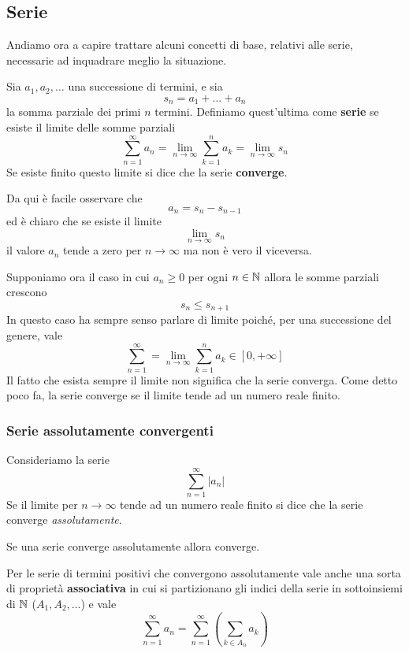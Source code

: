 \subsection{Serie}
Andiamo ora a capire trattare alcuni concetti di base, relativi alle serie, necessarie ad
inquadrare meglio la situazione.

\begin{definition}
	Sia $a_1, a_2, \dots$ una successione di termini, e sia
	\[ s_n = a_1 + \dots + a_n \]
	la somma parziale dei primi $n$ termini. Definiamo quest'ultima come \textbf{serie} se esiste
	il limite delle somme parziali
	\[ \sum_{n=1}^\infty a_n = \lim_{n \to \infty} \sum_{k=1}^n a_k = \lim_{n \to \infty} s_n \]
	Se esiste finito questo limite si dice che la serie \textbf{converge}.
\end{definition}

\begin{observation}
	Da qui è facile osservare che
	\[ a_n = s_n - s_{n-1} \]
	ed è chiaro che se esiste il limite
	\[ \lim_{n \to \infty} s_n \]
	il valore $a_n$ tende a zero per $n \to \infty$ ma non è vero il viceversa.
\end{observation}

Supponiamo ora il caso in cui $a_n \geq 0$ per ogni $n \in \mathbb{N}$ allora le somme parziali crescono
\[ s_n \leq s_{n+1} \]
In questo caso ha sempre senso parlare di limite poiché, per una successione del genere, vale
\[ \sum_{n=1}^\infty = \lim_{n \to \infty} \sum_{k=1}^n a_k \in [0, +\infty]  \]
Il fatto che esista sempre il limite non significa che la serie converga. Come detto poco fa, la
serie converge se il limite tende ad un numero reale finito.

\subsubsection{Serie assolutamente convergenti}
\begin{definition}
	Consideriamo la serie
	\[ \sum_{n=1}^\infty |a_n| \]
	Se il limite per $n \to \infty$ tende ad un numero reale finito si dice che la serie converge
	\emph{assolutamente}.
\end{definition}

\begin{theorem}
	Se una serie converge assolutamente allora converge.
\end{theorem}

Per le serie di termini positivi che convergono assolutamente vale anche una sorta di proprietà
\textbf{associativa} in cui si partizionano gli indici della serie in sottoinsiemi di $\mathbb{N}$
($A_1, A_2, \dots$) e vale
\[ \sum_{n=1}^\infty a_n = \sum_{n=1}^\infty \left( \sum_{k \in A_n} a_k \right) \]

